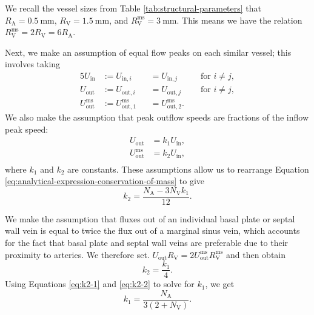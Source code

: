     We recall the vessel sizes from Table \ref{tab:structural-parameters} that $R_\text{A} = \qty{0.5}{\milli\metre}$, $R_\text{V} = \qty{1.5}{\milli\metre}$, and $R^\text{ms}_\text{V} = \qty{3}{\milli\metre}$. This means we have the relation $R^\text{ms}_\text{V} = 2R_\text{V} = 6R_\text{A}$.

    Next, we make an assumption of equal flow peaks on each similar vessel; this involves taking
    \begin{alignat*}{5}
        U_\text{in} & := U_{\text{in},i} && = U_{\text{in},j} && \text{ for } i \neq j, \\
        U_\text{out} & := U_{\text{out},i} && = U_{\text{out},j} && \text{ for } i \neq j, \\
        U^\text{ms}_\text{out} & := U^\text{ms}_{\text{out},1} && = U^\text{ms}_{\text{out},2}. &&
    \end{alignat*}
    We also make the assumption that peak outflow speeds are fractions of the inflow peak speed:
    \begin{align*}
        U_\text{out} & = k_1 U_\text{in}, \\
        U^\text{ms}_\text{out} & = k_2 U_\text{in}, \\
    \end{align*}
    where $k_1$ and $k_2$ are constants. These assumptions allow us to rearrange Equation \eqref{eq:analytical-expression-conservation-of-mass} to give
    \begin{equation}
        k_2 = \frac{N_\text{A}-3N_\text{V}k_1}{12}.
        \label{eq:k2-1}
    \end{equation}

    We make the assumption that fluxes out of an individual basal plate or septal wall vein is equal to twice the flux out of a marginal sinus vein, which accounts for the fact that basal plate and septal wall veins are preferable due to their proximity to arteries. We therefore set. $U_\text{out}R_\text{V} = 2U^\text{ms}_\text{out}R^\text{ms}_\text{V}$ and then obtain
    \begin{equation}
        k_2 = \frac{k_1}{4}.
        \label{eq:k2-2}
    \end{equation}
    Using Equations \eqref{eq:k2-1} and \eqref{eq:k2-2} to solve for $k_1$, we get
    \begin{equation}
        k_1 = \frac{N_\text{A}}{3(2 + N_\text{V})}.
    \end{equation}

